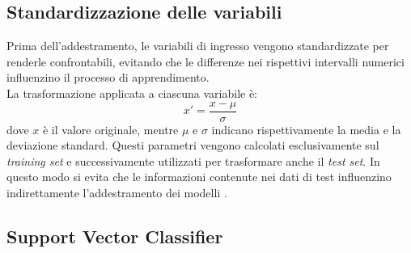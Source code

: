 \subsection{Standardizzazione delle variabili}
\label{subsec:standardizzazione-variabili}
Prima dell'addestramento, le variabili di ingresso vengono standardizzate per renderle confrontabili, evitando che le differenze nei rispettivi intervalli numerici influenzino il processo di apprendimento.\\ La trasformazione applicata a ciascuna variabile è:
\begin{equation}
	x' = \frac{x-\mu}{\sigma}
	\label{eq:standardizzazione}
\end{equation}
dove $x$ è il valore originale, mentre $\mu$ e $\sigma$ indicano rispettivamente la media e la deviazione standard. Questi parametri vengono calcolati esclusivamente sul \emph{training set} e successivamente utilizzati per trasformare anche il \emph{test set}. In questo modo si evita che le informazioni contenute nei dati di test influenzino indirettamente l'addestramento dei modelli \cite{kaufman2012leakage}.
\subsection{Support Vector Classifier}
\label{subsec:svc}
